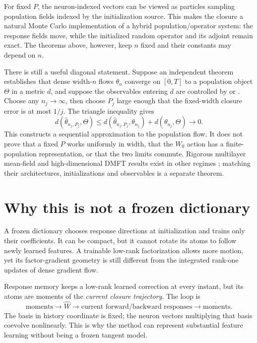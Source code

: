 \documentclass[11pt]{article}
\theoremstyle{definition}
\theoremstyle{remark}
\begin{document}
For fixed $P$, the neuron-indexed vectors can be viewed as particles sampling
population fields indexed by the initialization source.  This makes the closure
a natural Monte Carlo implementation of a hybrid population/operator system:
the response fields move, while the initialized random operator and its adjoint
remain exact.  The theorems above, however, keep $n$ fixed and their constants
may depend on $n$.

There is still a useful diagonal statement.  Suppose an independent theorem
establishes that dense width-$n$ flows $\theta_n$ converge on $[0,T]$ to a
population object $\Theta$ in a metric $d$, and suppose the observables entering
$d$ are controlled by  or .  Choose any
$n_j\to\infty$, then choose $P_j$ large enough that the fixed-width closure
error is at most $1/j$.  The triangle inequality gives
\[
 d(\widehat\theta_{n_j,P_j},\Theta)
 \le d(\widehat\theta_{n_j,P_j},\theta_{n_j})+d(\theta_{n_j},\Theta)
 \longrightarrow0.
\]
This constructs a sequential approximation to the population flow.  It does
not prove that a fixed $P$ works uniformly in width, that the $W_0$ action has a
finite-population representation, or that the two limits commute.  Rigorous
multilayer mean-field and high-dimensional DMFT results exist in other regimes
\citep{nguyen2023rigorous,celentano2021highdimensional}; matching their
architectures, initializations and observables is a separate theorem.

\section{Why this is not a frozen dictionary}

A frozen dictionary chooses response directions at initialization and trains
only their coefficients.  It can be compact, but it cannot rotate its atoms to
follow newly learned features.  A trainable low-rank factorization allows more
motion, yet its factor-gradient geometry is still different from the integrated
rank-one updates of dense gradient flow.

Response memory keeps a low-rank learned correction at every instant, but its
atoms are moments of the \emph{current closure trajectory}.  The loop is
\[
 \text{moments}\longrightarrow\widehat W
 \longrightarrow\text{current forward/backward responses}
 \longrightarrow\dot{\text{moments}}.
\]
The basis in history coordinate is fixed; the neuron vectors multiplying that
basis coevolve nonlinearly.  This is why the method can represent substantial
feature learning without being a frozen tangent model.
\end{document}
